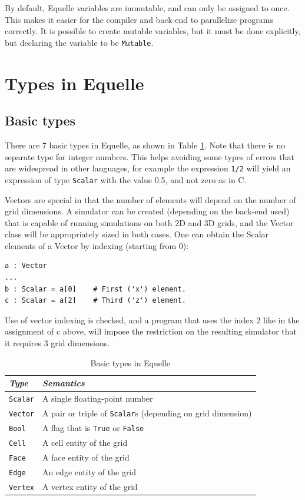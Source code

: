 \documentclass[11pt]{article}
\newcommand{\code}[1]{\texttt{#1}}
\begin{document}
By default, Equelle variables are immutable, and can only be assigned to once. This makes
it easier for the compiler and back-end to parallelize programs correctly. It is possible
to create mutable variables, but it must be done explicitly, but declaring the variable to
be \code{Mutable}.



\section{Types in Equelle}

\subsection{Basic types}

There are 7 basic types in Equelle, as shown in Table \ref{tab:basic-types}. Note that
there is no separate type for integer numbers. This helps avoiding some types of errors
that are widespread in other languages, for example the expression \code{1/2} will
yield an expression of type \code{Scalar} with the value 0.5, and not zero as in C.

Vectors are special in that the number of elements will depend on the number of grid
dimensions. A simulator can be created (depending on the back-end used) that is capable of
running simulations on both 2D and 3D grids, and the Vector class will be appropriately
sized in both cases. One can obtain the Scalar elements of a Vector by indexing (starting
from 0):

\begin{verbatim}
a : Vector
...
b : Scalar = a[0]    # First ('x') element.
c : Scalar = a[2]    # Third ('z') element.
\end{verbatim}

Use of vector indexing is checked, and a program that uses the index 2 like in the
assignment of c above, will impose the restriction on the resulting simulator that it
requires 3 grid dimensions.

\begin{table}
\begin{tabular}{l|l}
{\em Type} & {\em Semantics} \\
\hline
\code{Scalar} & A single floating-point number \\
\code{Vector} & A pair or triple of \code{Scalar}s (depending on grid dimension) \\
\code{Bool} & A flag that is \code{True} or \code{False} \\
\code{Cell} & A cell entity of the grid \\
\code{Face} & A face entity of the grid \\
\code{Edge} & An edge entity of the grid \\
\code{Vertex} & A vertex entity of the grid \\
\end{tabular}
\caption{Basic types in Equelle}
\label{tab:basic-types}
\end{table}
\end{document}
